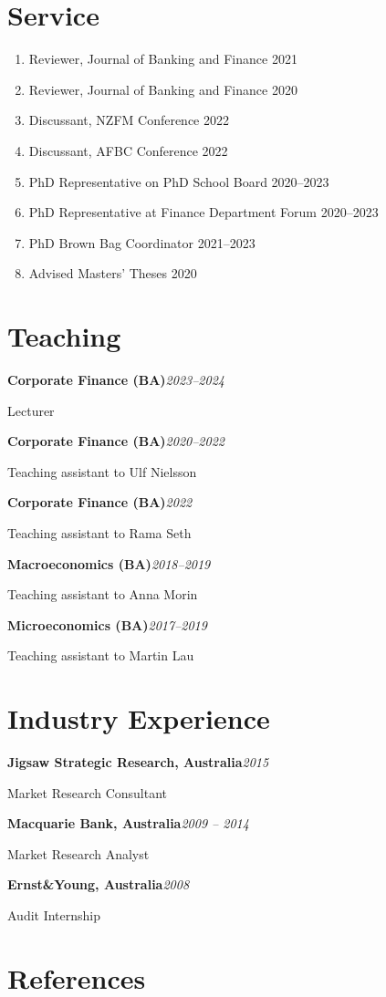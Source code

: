 \documentclass[11pt,a4paper]{article}
\newcommand{\cventry}[3]{%
  \noindent\textbf{#1}\hfill\textit{#2}\par
  #3\par\medskip
}
\begin{document}
\section{Service}

\begin{enumerate}
\item Reviewer, Journal of Banking and Finance \hfill 2021
\item Reviewer, Journal of Banking and Finance \hfill 2020
\item Discussant, NZFM Conference \hfill 2022
\item Discussant, AFBC Conference \hfill 2022
\item PhD Representative on PhD School Board \hfill 2020--2023
\item PhD Representative at Finance Department Forum \hfill 2020--2023
\item PhD Brown Bag Coordinator \hfill 2021--2023
\item Advised Masters' Theses \hfill 2020
\end{enumerate}

\section{Teaching}

\cventry{Corporate Finance (BA)}{2023--2024}{Lecturer}
\cventry{Corporate Finance (BA)}{2020--2022}{Teaching assistant to Ulf Nielsson}
\cventry{Corporate Finance (BA)}{2022}{Teaching assistant to Rama Seth}
\cventry{Macroeconomics (BA)}{2018--2019}{Teaching assistant to Anna Morin}
\cventry{Microeconomics (BA)}{2017--2019}{Teaching assistant to Martin Lau}

\section{Industry Experience}

\cventry{Jigsaw Strategic Research, Australia}{2015}{Market Research Consultant}
\cventry{Macquarie Bank, Australia}{2009 -- 2014}{Market Research Analyst}
\cventry{Ernst\&Young, Australia}{2008}{Audit Internship}

\section{References}
\end{document}
